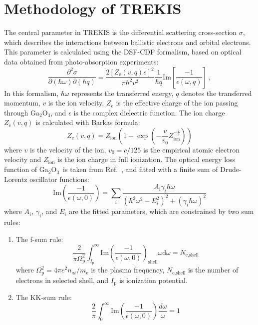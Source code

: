 \documentclass[aip,graphicx,amsmath,amssymb]{revtex4-1}
\newcommand{\ga}{$\text{Ga}_2\text{O}_3$}
\begin{document}
\section{Methodology of TREKIS}
\label{app:trekis}
The central parameter in TREKIS is the differential scattering cross-section 
$\sigma$, which describes the interactions between ballistic electrons and 
orbital electrons. 
This parameter is calculated using the DSF-CDF formalism, based 
on optical data obtained from photo-absorption experiments: 
\begin{equation} 
\frac{\partial^{2}\sigma}{\partial(\hbar\omega)\partial(\hbar q)} = 
\frac{2[Z_{\text{e}}(v,q)e]^{2}}{\pi\hbar^{2}v^{2}} \frac{1}{\hbar 
q}\mathrm{Im}[\frac{-1}{\epsilon(\omega,q)}]\ , \label{eq1} 
\end{equation} 
In this formalism, $\hbar\omega$ represents the transferred energy, $q$ denotes 
the transferred momentum, $v$ is the ion velocity, $Z_e$ is the effective 
charge of the ion passing through \ga, and $\epsilon$ is the complex 
dielectric function. 
The ion charge $Z_{\text{e}}(v,q)$ is calculated with Barkas formula:\cite{Gervais1994} 
\begin{equation} 
Z_{\text{e}}(v,q) = Z_{\text{ion}}(1-\exp(-\frac{v}{v_{0}}Z_{\text{ion}}^{-\frac{2}{3}})) 
\end{equation} 
where $v$ is the velocity of the ion, $v_{0}=c/125$ is the empirical atomic 
electron velocity and $Z_{\text{ion}}$ is the ion charge in full ionization. 
The optical energy loss function of \ga\ is taken from 
Ref.~, and fitted with a finite sum of Drude-Lorentz 
oscillator functions: 
\begin{equation} 
\mathrm{Im}(\frac{-1}{\epsilon(\omega,0)}) = \sum_{i} 
\frac{A_{\mathrm{i}}\gamma_{i}\hbar\omega}{(\hbar^{2}\omega^{2}-E_{i}^{2})^{2}+(\gamma_{i}\hbar\omega)^{2}} 
\end{equation} 
where $A_{i}$, $\gamma_{i}$, and $E_{i}$ are the fitted parameters, which are 
constrained by two sum rules: 
\begin{enumerate} 
\item The f-sum rule: 
\begin{equation} 
\frac{2}{\pi 
\Omega_{\text{p}}^{2}}\int_{I_{\text{p}}}^{\infty}\mathrm{Im}(\frac{-1}{\epsilon(\omega,0)})_{\text{shell}}\omega 
\mathrm{d}\omega = N_{\text{e,shell}} 
\end{equation} 
where $\Omega_{\text{p}}^{2}=4\pi e^{2}n_{at}/m_{\text{e}}$ is the plasma frequency, 
$N_{\text{e,shell}}$ is the number of electrons in selected shell, and $I_{\text{p}}$ is 
ionization potential. 
\item The KK-sum rule: 
\begin{equation} 
\frac{2}{\pi}\int_{0}^{\infty} 
\mathrm{Im}(\frac{-1}{\epsilon(\omega,0)})\frac{d\omega}{\omega} = 1 
\end{equation} 
\end{enumerate} 
\end{document}
